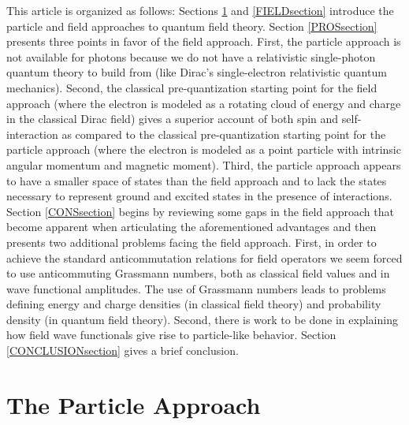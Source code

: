 \documentclass[onecolumn,secnumarabic,amsmath,amssymb,balancelastpage,nofootinbib]{article}
\begin{document}
This article is organized as follows:  Sections \ref{PARTICLEsection} and \ref{FIELDsection} introduce the particle and field approaches to quantum field theory.  Section \ref{PROSsection} presents three points in favor of the field approach.  First, the particle approach is not available for photons because we do not have a relativistic single-photon quantum theory to build from (like Dirac's single-electron relativistic quantum mechanics).  Second, the classical pre-quantization starting point for the field approach (where the electron is modeled as a rotating cloud of energy and charge in the classical Dirac field) gives a superior account of both spin and self-interaction as compared to the classical pre-quantization starting point for the particle approach (where the electron is modeled as a point particle with intrinsic angular momentum and magnetic moment).  Third, the particle approach appears to have a smaller space of states than the field approach and to lack the states necessary to represent ground and excited states in the presence of interactions.  Section \ref{CONSsection} begins by reviewing some gaps in the field approach that become apparent when articulating the aforementioned advantages and then presents two additional problems facing the field approach.  First, in order to achieve the standard anticommutation relations for field operators we seem forced to use anticommuting Grassmann numbers, both as classical field values and in wave functional amplitudes.  The use of Grassmann numbers leads to problems defining energy and charge densities (in classical field theory) and probability density (in quantum field theory).  Second, there is work to be done in explaining how field wave functionals give rise to particle-like behavior. Section \ref{CONCLUSIONsection} gives a brief conclusion.





\section{The Particle Approach}\label{PARTICLEsection}
\end{document}
